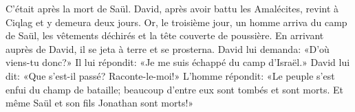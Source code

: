C’était après la mort de Saül.
David, après avoir battu les Amalécites, revint à Ciqlag et y demeura deux jours.
Or, le troisième jour, un homme arriva du camp de Saül,
	les vêtements déchirés et la tête couverte de poussière.
En arrivant auprès de David, il se jeta à terre et se prosterna.
David lui demanda:
	«D’où viens-tu donc?»
	Il lui répondit: «Je me suis échappé du camp d’Israël.»
David lui dit: «Que s’est-il passé? Raconte-le-moi!»
L’homme répondit: «Le peuple s’est enfui du champ de bataille;
	beaucoup d’entre eux sont tombés et sont morts.
	Et même Saül et son fils Jonathan sont morts!»
